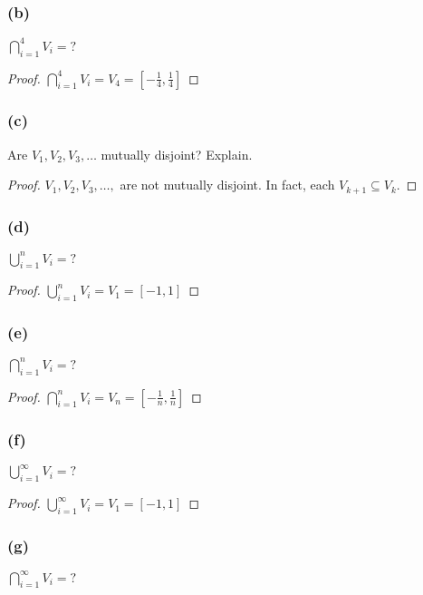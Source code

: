 \documentclass[14pt]{extarticle}
\newcommand{\dps}{\displaystyle}
\begin{document}
\subsubsection{(b)}
\(\dps \bigcap_{i=1}^{4}V_i = ?\)

\begin{proof}
  \(\dps \bigcap_{i=1}^{4}V_i = V_4 = \left[-\frac{1}{4}, \frac{1}{4}\right]\)
\end{proof}

\subsubsection{(c)}
Are \(V_1, V_2, V_3, \ldots\) mutually disjoint? Explain.

\begin{proof}
  $V_1, V_2, V_3, \ldots,$ are not mutually disjoint. In fact, each \(V_{k+1} \subseteq V_k\).
\end{proof}

\subsubsection{(d)}
\(\dps \bigcup_{i=1}^{n}V_i = ?\)

\begin{proof}
  \(\dps \bigcup_{i=1}^{n}V_i = V_1 = [-1, 1]\)
\end{proof}

\subsubsection{(e)}
\(\dps \bigcap_{i=1}^{n}V_i = ?\)

\begin{proof}
  \(\dps \bigcap_{i=1}^{n}V_i = V_n = \left[-\frac{1}{n}, \frac{1}{n}\right]\)
\end{proof}

\subsubsection{(f)}
\(\dps \bigcup_{i=1}^{\infty}V_i = ?\)

\begin{proof}
  \(\dps \bigcup_{i=1}^{\infty}V_i = V_1 = [-1, 1]\)
\end{proof}

\subsubsection{(g)}
\(\dps \bigcap_{i=1}^{\infty}V_i = ?\)
\end{document}
